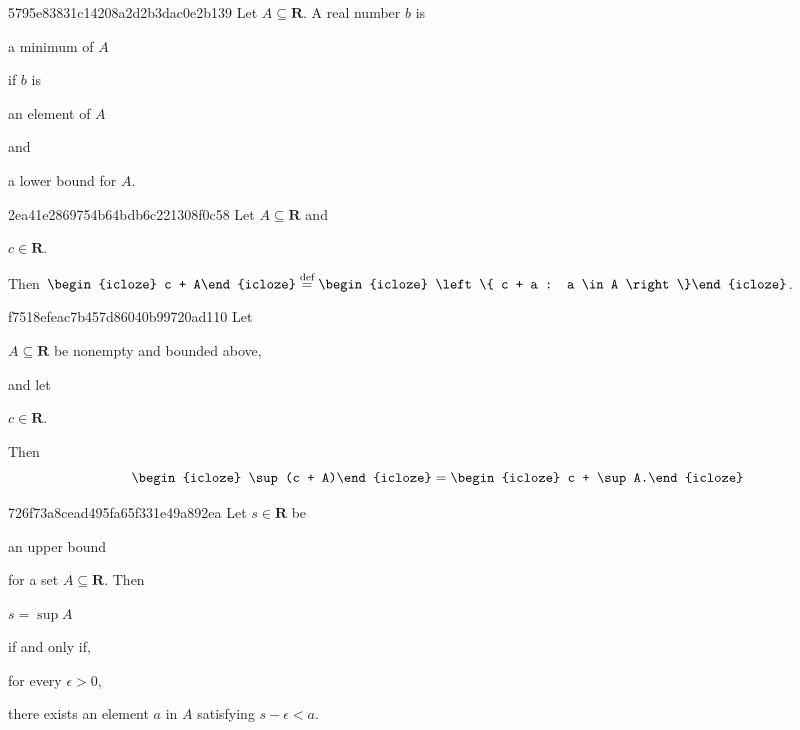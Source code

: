 \begin{note}{5795e83831c14208a2d2b3dac0e2b139}
    Let \({ A \subseteq \mathbf{R} }\). A real number \({ b }\) is \begin{icloze}{3}a minimum of \({ A }\)\end{icloze} if \({ b }\) is \begin{icloze}{2}an element of \({ A }\)\end{icloze} and \begin{icloze}{1}a lower bound for \({ A }\).\end{icloze}
\end{note}

\begin{note}{2ea41e2869754b64bdb6c221308f0c58}
    Let \({ A \subseteq \mathbf{R} }\) and \begin{icloze}{3}\({ c \in \mathbf{R} }\).\end{icloze}
    Then \({ \begin{icloze}{2}c + A\end{icloze} \overset{\text{def}}= \begin{icloze}{1}\left\{ c + a : a \in A \right\}\end{icloze} }\).
\end{note}

\begin{note}{f7518efeac7b457d86040b99720ad110}
    Let \begin{icloze}{2}\({ A \subseteq \mathbf{R} }\) be nonempty and bounded above,\end{icloze} and let \begin{icloze}{4}\({ c \in \mathbf{R} }\).\end{icloze}
    Then
    \[
        \begin{icloze}{3}\sup(c + A)\end{icloze} = \begin{icloze}{1}c + \sup A.\end{icloze}
    \]
\end{note}

\begin{note}{726f73a8cead495fa65f331e49a892ea}
    Let \({ s \in \mathbf{R} }\) be \begin{icloze}{5}an upper bound\end{icloze} for a set \({ A \subseteq \mathbf{R} }\).
    Then \begin{icloze}{3}\({ s = \sup A }\)\end{icloze} \begin{icloze}{4}if and only if,\end{icloze} \begin{icloze}{2}for every \({ \epsilon > 0 }\),\end{icloze} \begin{icloze}{1}there exists an element \({ a }\) in \({ A }\) satisfying \({ s - \epsilon < a }\).\end{icloze}
\end{note}

